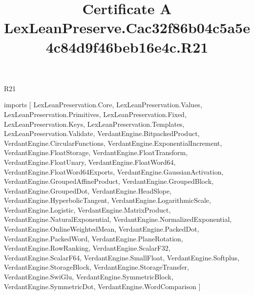 \begin{lexlean}{R21}
\title{Certificate A LexLeanPreserve.Cac32f86b04c5a5e4c84d9f46beb16e4c.R21}
\begin{coremodule}
imports [
  LexLeanPreservation.Core,
  LexLeanPreservation.Values,
  LexLeanPreservation.Primitives,
  LexLeanPreservation.Fixed,
  LexLeanPreservation.Keys,
  LexLeanPreservation.Templates,
  LexLeanPreservation.Validate,
  VerdantEngine.BitpackedProduct,
  VerdantEngine.CircularFunctions,
  VerdantEngine.ExponentialIncrement,
  VerdantEngine.FloatStorage,
  VerdantEngine.FloatTransform,
  VerdantEngine.FloatUnary,
  VerdantEngine.FloatWord64,
  VerdantEngine.FloatWord64Exports,
  VerdantEngine.GaussianActivation,
  VerdantEngine.GroupedAffineProduct,
  VerdantEngine.GroupedBlock,
  VerdantEngine.GroupedDot,
  VerdantEngine.HeadSlope,
  VerdantEngine.HyperbolicTangent,
  VerdantEngine.LogarithmicScale,
  VerdantEngine.Logistic,
  VerdantEngine.MatrixProduct,
  VerdantEngine.NaturalExponential,
  VerdantEngine.NormalizedExponential,
  VerdantEngine.OnlineWeightedMean,
  VerdantEngine.PackedDot,
  VerdantEngine.PackedWord,
  VerdantEngine.PlaneRotation,
  VerdantEngine.RowRanking,
  VerdantEngine.ScalarF32,
  VerdantEngine.ScalarF64,
  VerdantEngine.SmallFloat,
  VerdantEngine.Softplus,
  VerdantEngine.StorageBlock,
  VerdantEngine.StorageTransfer,
  VerdantEngine.SwiGlu,
  VerdantEngine.SymmetricBlock,
  VerdantEngine.SymmetricDot,
  VerdantEngine.WordComparison
]


\end{coremodule}
\end{lexlean}
